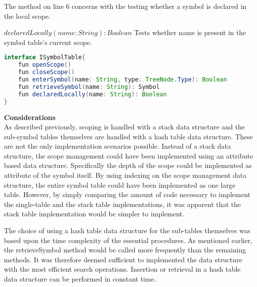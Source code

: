 The method on line 6 concerns with the testing whether a symbol is declared in the local scope.

$declaredLocally(name: String): Boolean$ Tests whether name is present in the symbol table's current scope.

\begin{lstlisting}[language=java,label=lis:STInterface,caption=The interface which all symbol table implementations must implement.]
interface ISymbolTable{
	fun openScope()
	fun closeScope()
	fun enterSymbol(name: String, type: TreeNode.Type): Boolean
	fun retrieveSymbol(name: String): Symbol
	fun declaredLocally(name: String): Boolean
}
\end{lstlisting}

\textbf{Considerations}\\
As described previously, scoping is handled with a stack data structure and the sub-symbol tables themselves are handled with a hash table data structure.
These are not the only implementation scenarios possible.
Instead of a stack data structure, the scope management could have been implemented using an attribute based data structure.
Specifically the depth of the scope could be implemented as attribute of the symbol itself.
By using indexing on the scope management data structure, the entire symbol table could have been implemented as one large table.
However, by simply comparing the amount of code necessary to implement the single-table and the stack table implementations, it was apparent that the stack table implementation would be simpler to implement.

The choice of using a hash table data structure for the sub-tables themselves was based upon the time complexity of the essential procedures.
As mentioned earlier, the retrieveSymbol method would be called more frequently than the remaining methods.
It was therefore deemed sufficient to implemented the data structure with the most efficient search operations.
Insertion or retrieval in a hash table data structure can be performed in constant time. 
